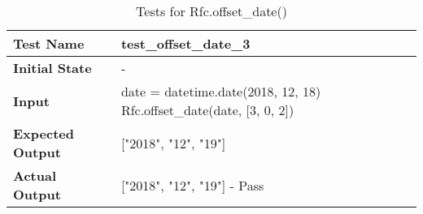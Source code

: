 \documentclass[12pt, titlepage]{article}
\begin{document}
		\begin{table}[!htbp] 	 
			\begin{tabularx}{\textwidth}{|l|X|}%
				\hline
                \textbf{Test Name} & test\_offset\_date\_3  
                \\\hline
                \textbf{Initial State} & -
                \\\hline
                \textbf{Input} & date = datetime.date(2018, 12, 18) \newline Rfc.offset\_date(date, [3, 0, 2])
                \\\hline 
                \textbf{Expected Output} & ["2018", "12", "19"]
                \\\hline
                \textbf{Actual Output} & ["2018", "12", "19"] - Pass
                \\\hline
			\end{tabularx}\\ %
			\caption{Tests for Rfc.offset\_date()}
			\label{Table}
	    \end{table}
	    
\FloatBarrier       %

\newpage %
\end{document}
